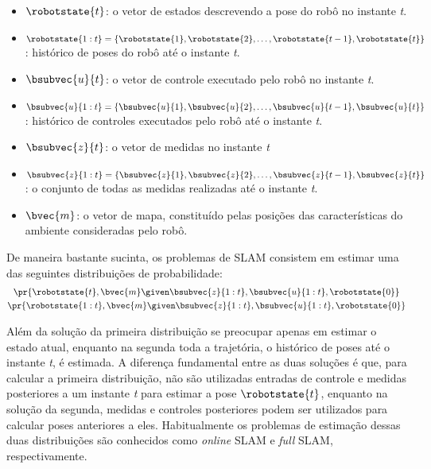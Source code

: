 \begin{itemize}
  \item $\robotstate{t}$: o vetor de estados descrevendo a pose do robô no instante \emph{t}.
  \item $\robotstate{1:t} = \{ \robotstate{1}, \robotstate{2}, \dots, 
  \robotstate{t-1}, \robotstate{t} \}$: histórico de poses do robô até o instante \emph{t}.
  \item $\bsubvec{u}{t}$: o vetor de controle executado pelo robô no instante \emph{t}.
  \item $\bsubvec{u}{1:t} = \{ \bsubvec{u}{1}, \bsubvec{u}{2}, \dots, 
  \bsubvec{u}{t-1}, \bsubvec{u}{t} \}$: histórico de controles executados pelo robô até o instante \emph{t}.
  \item $\bsubvec{z}{t}$: o vetor de medidas no instante \emph{t}
  \item $\bsubvec{z}{1:t} = \{ \bsubvec{z}{1}, \bsubvec{z}{2}, \dots, 
  \bsubvec{z}{t-1}, \bsubvec{z}{t} \}$: o conjunto de todas as medidas realizadas até o instante \emph{t}.
  \item $\bvec{m}$: o vetor de mapa, constituído pelas posições das características do ambiente consideradas pelo robô.
\end{itemize}

De maneira bastante sucinta, os problemas de SLAM consistem em estimar uma das 
seguintes distribuições de probabilidade:
\begin{gather}
  \pr{\robotstate{t}, \bvec{m} \given \bsubvec{z}{1:t} , \bsubvec{u}{1:t}, 
    \robotstate{0}}
  \label{eq:online-slam-probability} \\
  \pr{\robotstate{1:t}, \bvec{m} \given \bsubvec{z}{1:t} , \bsubvec{u}{1:t}, 
    \robotstate{0}}
  \label{eq:full-slam-probability}
\end{gather}

Além da solução da primeira distribuição se preocupar apenas em estimar o 
estado atual, enquanto na segunda toda a trajetória, o histórico de 
poses até o instante \emph{t}, é estimada. A diferença fundamental entre as 
duas soluções é que, para calcular a primeira distribuição, não são utilizadas entradas de controle e medidas posteriores a um instante 
\emph{t} para estimar a pose $\robotstate{t}$, enquanto na 
solução da segunda, medidas e controles posteriores podem ser utilizados para 
calcular poses anteriores a eles. Habitualmente os problemas de estimação 
dessas duas distribuições são conhecidos como \textit{online} SLAM e 
\textit{full} SLAM, respectivamente. 

